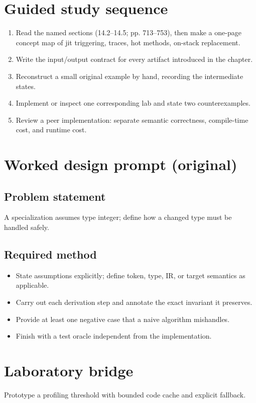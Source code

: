 \documentclass[10pt,letterpaper]{article}
\begin{document}
\section{Guided study sequence}
\begin{enumerate}
\item Read the named sections (14.2--14.5; pp. 713--753), then make a one-page concept map of jit triggering, traces, hot methods, on-stack replacement.
\item Write the input/output contract for every artifact introduced in the chapter.
\item Reconstruct a small original example by hand, recording the intermediate states.
\item Implement or inspect one corresponding lab and state two counterexamples.
\item Review a peer implementation: separate semantic correctness, compile-time cost, and runtime cost.
\end{enumerate}

\section{Worked design prompt (original)}
\subsection{Problem statement}
A specialization assumes type integer; define how a changed type must be handled safely.
\subsection{Required method}
\begin{itemize}
\item State assumptions explicitly; define token, type, IR, or target semantics as applicable.
\item Carry out each derivation step and annotate the exact invariant it preserves.
\item Provide at least one negative case that a naive algorithm mishandles.
\item Finish with a test oracle independent from the implementation.
\end{itemize}


\section{Laboratory bridge}
Prototype a profiling threshold with bounded code cache and explicit fallback.
\end{document}
